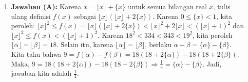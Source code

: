 \documentclass{article}
\begin{document}
\begin{enumerate}
\item \textbf{Jawaban (A):} Karena $x=\lfloor x\rfloor+\{x\}$ untuk semua bilangan real $x$, tulis ulang definisi $f(x)$ sebagai $\lfloor x\rfloor(\lfloor x\rfloor+2\{x\})$. Karena $0\le\{x\}<1$, kita peroleh: $\lfloor x\rfloor^{2}\le f(x)=\lfloor x\rfloor(\lfloor x\rfloor+2\{x\})<\lfloor x\rfloor^{2}+2\lfloor x\rfloor<(\lfloor x\rfloor+1)^{2}$ dan $\lfloor x\rfloor^{2}\le f(x)<(\lfloor x\rfloor+1)^{2}$. Karena $18^{2}<334<343<19^{2}$, kita peroleh $\lfloor\alpha\rfloor=\lfloor\beta\rfloor=18$. Selain itu, karena $\lfloor\alpha\rfloor=\lfloor\beta\rfloor$, berlaku $\alpha-\beta=\{\alpha\}-\{\beta\}$. Kita tahu bahwa $9=f(\alpha)-f(\beta)=18(18+2\{\alpha\})-18(18+2\{\beta\})$. Maka, $9=18(18+2\{\alpha\})-18(18+2\{\beta\})\Rightarrow\frac{1}{4}=\{\alpha\}-\{\beta\}$. Jadi, jawaban kita adalah $\frac{1}{4}$.
\end{enumerate}
\end{document}
